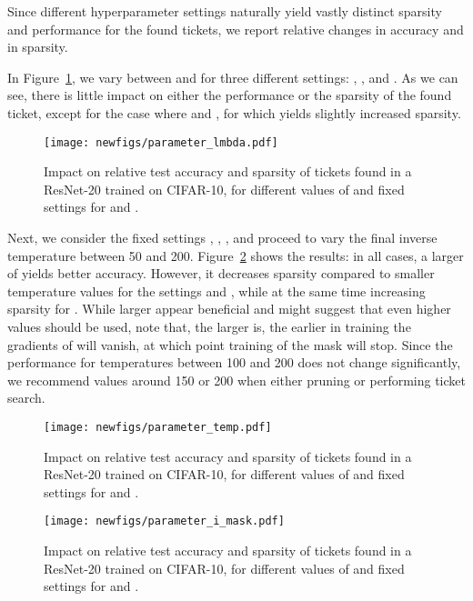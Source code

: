 \documentclass{article}
\begin{document}
Since different hyperparameter settings naturally yield vastly distinct sparsity and performance for the found tickets, we report relative changes in accuracy and in sparsity.

In Figure~\ref{fig:hyper1}, we vary  between  and  for three different  settings: , , and . As we can see, there is little impact on either the performance or the sparsity of the found ticket, except for the case where  and , for which  yields slightly increased sparsity.

\begin{figure}[!htb]
    \centering
     \texttt{[image: newfigs/parameter\_lmbda.pdf]}
    \caption{Impact on relative test accuracy and sparsity of tickets found in a ResNet-20 trained on CIFAR-10, for different values of  and fixed settings for  and .}
    \label{fig:hyper1}
\end{figure}

Next, we consider the fixed settings , , , and proceed to vary the final inverse temperature  between 50 and 200. Figure~\ref{fig:hyper2} shows the results: in all cases, a larger  of  yields better accuracy. However, it decreases sparsity compared to smaller temperature values for the settings  and , while at the same time increasing sparsity for . While larger  appear beneficial and might suggest that even higher values should be used, note that, the larger  is, the earlier in training the gradients of  will vanish, at which point training of the mask will stop. Since the performance for temperatures between 100 and 200 does not change significantly, we recommend values around 150 or 200 when either pruning or performing ticket search.

\begin{figure}[t]
    \centering
     \texttt{[image: newfigs/parameter\_temp.pdf]}
    \caption{Impact on relative test accuracy and sparsity of tickets found in a ResNet-20 trained on CIFAR-10, for different values of  and fixed settings for  and .}
    \label{fig:hyper2}
\end{figure}

\begin{figure}[t]
    \centering
     \texttt{[image: newfigs/parameter\_i\_mask.pdf]}
    \caption{Impact on relative test accuracy and sparsity of tickets found in a ResNet-20 trained on CIFAR-10, for different values of  and fixed settings for  and .}
    \label{fig:hyper3}
\end{figure}
\end{document}

